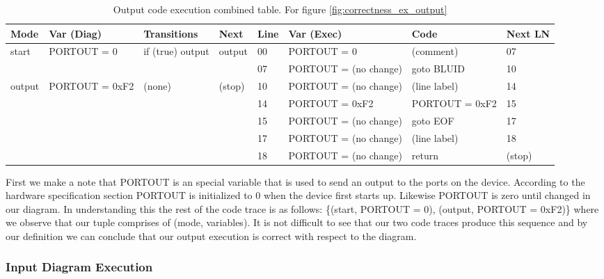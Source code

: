 \begin{table}[htcb]
	\caption{Output code execution combined table. For figure \ref{fig:correctness_ex_output}}
	\centering
	\tablefontsize
		\begin{tabular}{| p{} | p{} | p{} | p{} | p{} | p{} | p{} | p{} |}
			\hline
			\textbf{Mode} 		&	\textbf{Var (Diag)} 		& 	\textbf{Transitions} 		& 	\textbf{Next}		&	\textbf{Line}		&	\textbf{Var (Exec)	}	&	\textbf{Code}	&	\textbf{Next LN} \\
			\hline
			start 				&	PORTOUT = 0					&	if (true) output			&	output				&	00					&	PORTOUT = 0				& 	(comment)		&	07 \\
			\hline
								&								&								&						&	07					&   PORTOUT = (no change)	&	goto BLUID		&	10 \\
			\hline
			output				&	PORTOUT = 0xF2				&	(none)						&	(stop)				&	10					&	PORTOUT = (no change)	&	(line label)	&	14 \\
			\hline
								&								&								&						&	14					&	PORTOUT = 0xF2			&	PORTOUT = 0xF2	&	15 \\
			\hline
								&								&								&						&	15					&	PORTOUT = (no change)	&	goto EOF		&	17 \\
			\hline
								&								&								&						&	17					&	PORTOUT = (no change)	&	(line label)	&	18 \\
			\hline
								&								&								&						&	18					&	PORTOUT = (no change)	&	return			&	(stop) \\
			\hline
		\end{tabular}
	\label{table:OutputExecCombined}
\end{table}

First we make a note that PORTOUT is an special variable that is used to send an output to the ports on the device.
According to the hardware specification section PORTOUT is initialized to 0 when the device first starts up.
Likewise PORTOUT is zero until changed in our diagram. In understanding this the rest of the code trace is as follows:
\{(start, PORTOUT = 0), (output, PORTOUT = 0xF2)\} where we observe that our tuple comprises of (mode, variables). 
It is not difficult to see that our two code traces produce this sequence and by our definition we can conclude that our
output execution is correct with respect to the diagram.


\subsubsection{Input Diagram Execution}

